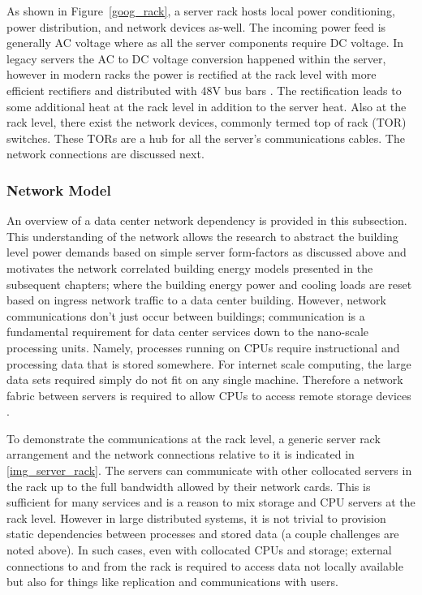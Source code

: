             
            
            As shown in Figure~\ref{goog_rack}, a server rack hosts local power conditioning, power distribution, and network devices as-well. The incoming power feed is generally AC voltage where as all the server components require DC voltage. In legacy servers the AC to DC voltage conversion happened within the server, however in modern racks the power is rectified at the rack level with more efficient rectifiers and distributed with 48V bus bars \cite{open_compute_48V}. The rectification leads to some additional heat at the rack level in addition to the server heat. Also at the rack level, there exist the network devices, commonly termed top of rack (TOR) switches. These TORs are a hub for all the server's communications cables. The network connections are discussed next. 
    
        \subsubsection{Network Model}
        \label{Network}
        
        An overview of a data center network dependency is provided in this subsection. This understanding of the network allows the research to abstract the building level power demands based on simple server form-factors as discussed above and motivates the network correlated building energy models presented in the subsequent chapters; where the building energy power and cooling loads are reset based on ingress network traffic to a data center building. However, network communications don't just occur between buildings; communication is a fundamental requirement for data center services down to the nano-scale processing units. Namely, processes running on CPUs require instructional and processing data that is stored somewhere. For internet scale computing, the large data sets required simply do not fit on any single machine. Therefore a network fabric between servers is required to allow CPUs to access remote storage devices \cite{mccullough2012enabling}.
        
        To demonstrate the communications at the rack level, a generic server rack arrangement and the network connections relative to it is indicated in \ref{img_server_rack}. The servers can communicate with other collocated servers in the rack up to the full bandwidth allowed by their network cards. This is sufficient for many services and is a reason to mix storage and CPU servers at the rack level. However in large distributed systems, it is not trivial to provision static dependencies between processes and stored data (a couple challenges are noted above). In such cases, even with collocated CPUs and storage; external connections to and from the rack is required to access data not locally available but also for things like replication and communications with users. 
    
